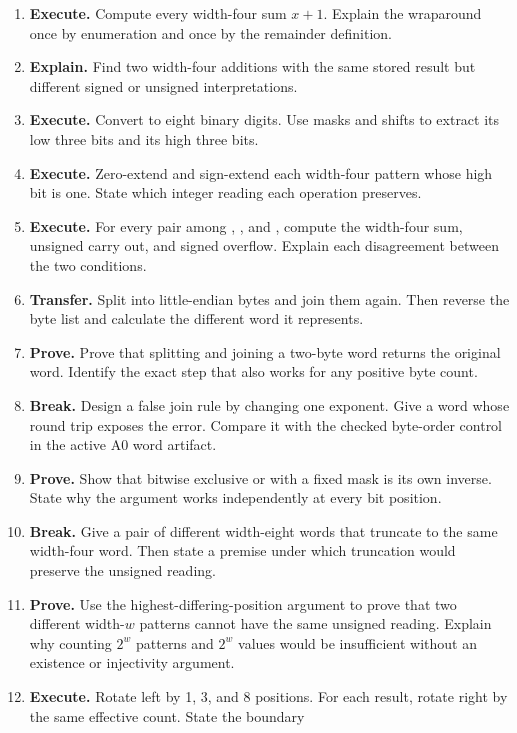 \begin{enumerate}
\item \textbf{Execute.} Compute every width-four sum \(x+1\). Explain the wraparound once by
enumeration and once by the remainder definition.
\item \textbf{Explain.} Find two width-four additions with the same stored result but different
signed or unsigned interpretations.
\item \textbf{Execute.} Convert  to eight binary digits. Use masks and shifts to
extract its low three bits and its high three bits.
\item \textbf{Execute.} Zero-extend and sign-extend each width-four pattern whose high bit is
one. State which integer reading each operation preserves.
\item \textbf{Execute.} For every pair among , , and , compute
the width-four sum, unsigned carry out, and signed overflow. Explain each
disagreement between the two conditions.
\item \textbf{Transfer.} Split  into little-endian bytes and join them again.
Then reverse the byte list and calculate the different word it represents.
\item \textbf{Prove.} Prove that splitting and joining a two-byte word returns the original
word. Identify the exact step that also works for any positive byte count.
\item \textbf{Break.} Design a false join rule by changing one exponent. Give a word whose
round trip exposes the error. Compare it with the checked byte-order control in
the active A0 word artifact.
\item \textbf{Prove.} Show that bitwise exclusive or with a fixed mask is its
own inverse. State why the argument works independently at every bit position.
\item \textbf{Break.} Give a pair of different width-eight words that truncate
to the same width-four word. Then state a premise under which truncation would
preserve the unsigned reading.
\item \textbf{Prove.} Use the highest-differing-position argument to prove
that two different width-\(w\) patterns cannot have the same unsigned reading.
Explain why counting \(2^w\) patterns and \(2^w\) values would be insufficient
without an existence or injectivity argument.
\item \textbf{Execute.} Rotate  left by 1, 3, and 8 positions.
For each result, rotate right by the same effective count. State the boundary

\end{enumerate}
